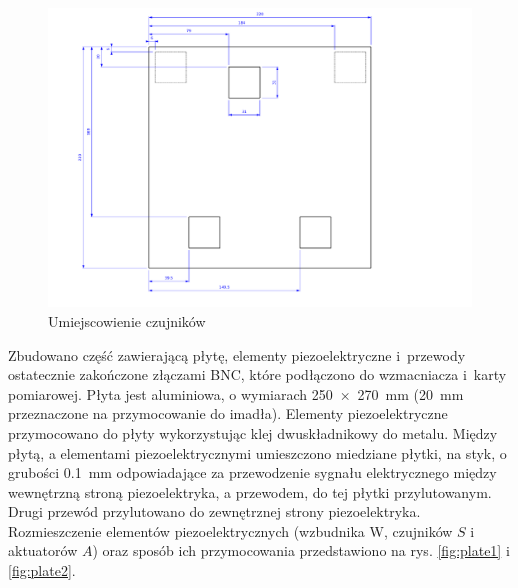 \documentclass[polish,a4paper,11pt]{mwart}
\begin{document}
\begin{figure}[!tbh]
  \centering
  \includegraphics[width=\textwidth]{./vecgraphics/plate_dim.pdf}
  \caption{Umiejscowienie czujników}
  \label{fig:wymiary}
\end{figure}

Zbudowano część zawierającą płytę, elementy piezoelektryczne i~przewody
ostatecznie zakończone złączami BNC, które podłączono do wzmacniacza i~karty
pomiarowej.  Płyta jest aluminiowa, o wymiarach \SI{250 x 270}{\milli\meter}
(\SI{20}{\milli\meter}
przeznaczone na przymocowanie do imadła). Elementy piezoelektryczne
przymocowano do płyty wykorzystując klej dwuskładnikowy do metalu. Między
płytą, a elementami piezoelektrycznymi umieszczono miedziane płytki, na styk, o
grubości \SI{0.1}{\milli\meter} odpowiadające za przewodzenie sygnału elektrycznego między
wewnętrzną stroną piezoelektryka, a przewodem, do tej płytki przylutowanym.
Drugi przewód przylutowano do zewnętrznej strony piezoelektryka. Rozmieszczenie
elementów piezoelektrycznych (wzbudnika W, czujników $S$ i aktuatorów $A$) oraz
sposób ich przymocowania przedstawiono na rys. \ref{fig:plate1} i
\ref{fig:plate2}.
\end{document}
